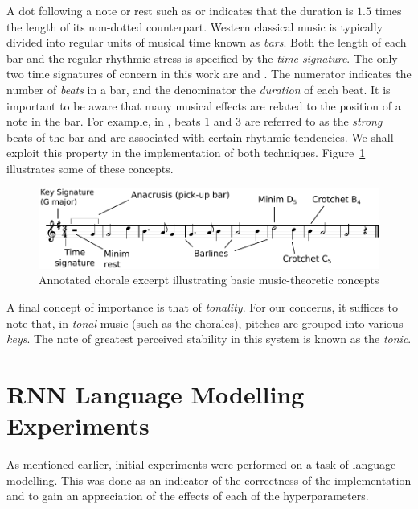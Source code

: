 \documentclass[12pt,a4paper,twoside,openright]{report}
\begin{document}
A dot following a note or rest such as \crotchetDotted{} or \quaverRestDotted{}
indicates that the duration is $1.5$ times the length of its non-dotted
counterpart. Western classical music is typically divided into regular units of
musical time known as \emph{bars}. Both the length of each bar and the regular
rhythmic stress is specified by the \emph{time signature}. The only two time
signatures of concern in this work are  and
. The numerator indicates the number of \emph{beats} in
a bar, and the denominator the \emph{duration} of each beat. It is important to
be aware that many musical effects are related to the position of a note in the
bar. For example, in , beats $1$ and $3$ are referred to
as the \emph{strong} beats of the bar and are associated with certain rhythmic
tendencies. We shall exploit this property in the implementation of both
techniques. Figure~\ref{fig:annotated-score} illustrates some of these concepts.

\begin{figure}[H]
\centering
\includegraphics[width=400pt]{figs/aus_meines_annotated.pdf}
\caption{Annotated chorale excerpt illustrating basic music-theoretic concepts}
\label{fig:annotated-score}
\end{figure}

A final concept of importance is that of \emph{tonality}. For our concerns, it
suffices to note that, in \emph{tonal} music (such as the chorales), pitches are
grouped into various \emph{keys}. The note of greatest perceived stability in
this system is known as the \emph{tonic}. 

\chapter{RNN Language Modelling Experiments}\label{apx:rnn-language}

As mentioned earlier, initial experiments were performed on a task of language
modelling. This was done as an indicator of the correctness of the
implementation and to gain an appreciation of the effects of each of the
hyperparameters.
\end{document}
